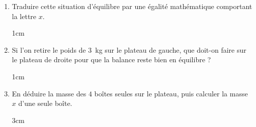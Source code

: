 \documentclass[a4paper]{book}
\begin{document}
\begin{exercice}
\begin{center}
        \end{center}

        
        \begin{enumerate}
            \item Traduire cette situation d'équilibre par une égalité mathématique comportant la lettre $x$.
            \begin{ZoneReponse}{1cm}
            \end{ZoneReponse}
            \item Si l'on retire le poids de $3$~kg sur le plateau de gauche, que doit-on faire sur le plateau de droite pour que la balance reste bien en équilibre ?
            \begin{ZoneReponse}{1cm}
            \end{ZoneReponse}
            \item En déduire la masse des $4$ boîtes seules sur le plateau, puis calculer la masse $x$ d'une seule boîte.
            \begin{ZoneReponse}{3cm}
            \end{ZoneReponse}
        \end{enumerate}
    \end{exercice}

\newpage
\end{document}
